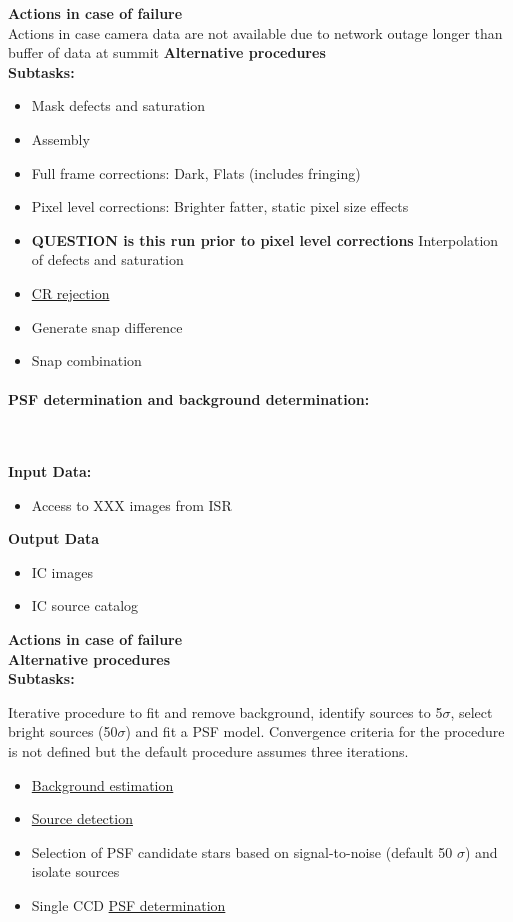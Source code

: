 {\bf Actions in case of failure}\\
Actions in case camera data are not available due to network outage
longer than buffer of data at summit
{\bf Alternative procedures}\\

\noindent
{\bf Subtasks:}
\begin{itemize}
\item Mask defects and saturation
\item Assembly
\item Full frame corrections: Dark, Flats (includes fringing)
\item Pixel level corrections: Brighter fatter, static pixel size effects
\item {\bf QUESTION is this run prior to pixel level corrections} Interpolation of defects and saturation
\item \hyperref[sec:artifact]{CR rejection}
\item Generate snap difference
\item Snap combination
\end{itemize}


\paragraph{PSF determination and background determination:}~

\noindent
{\bf Input Data:}\\
\begin{itemize}
\item Access to XXX images from ISR 
\end{itemize}
{\bf Output Data}\\
\begin{itemize}
\item IC images 
\item IC source catalog 
\end{itemize}
 {\bf Actions in case of failure}\\
{\bf Alternative procedures}\\

\noindent
{\bf Subtasks:}

Iterative procedure to fit and remove background, identify sources to
5$\sigma$, select bright sources (50$\sigma$) and fit a PSF
model. Convergence criteria for the procedure is not defined but the
default procedure assumes three iterations.

\begin{itemize}
\item \hyperref[sec:acBackgroundEstimation]{Background estimation}
\item \hyperref[sec:acSourceDetection]{Source detection}
\item Selection of PSF candidate stars based on signal-to-noise
  (default 50 $\sigma$) and isolate sources
\item Single CCD \hyperref[sec:acSingleCCDPSF]{PSF determination}
\end{itemize}

